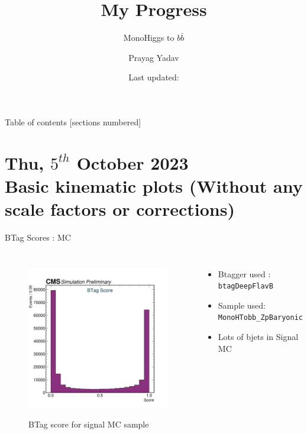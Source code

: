\documentclass[10pt,xcolor=dvipsnames]{beamer}
\title{My Progress}
\subtitle{MonoHiggs to $b \bar{b}$}
\author{Prayag Yadav}
\institute{University of Hyderabad}
\date{Last updated: \DTMnow{}}
\begin{document}
\maketitle

\begin{frame}{Table of contents}
  [sections numbered]
  \tableofcontents%
\end{frame}


\section[Basic kinematic plots ]{\small{Thu, $5^{th}$ October 2023 } \\ Basic kinematic plots \tiny{(Without any scale factors or corrections)} }

  \begin{frame}[fragile]{BTag Scores : MC} 
    \begin{columns}
    \begin{figure} 
    \centering 
     \includegraphics[width=1\textwidth]{../Archive/KinemPlots/TagMC.png }
    \label{TagMC} 
    \caption{BTag score for signal MC sample}
    \end{figure} 
    \begin{itemize} 
    \raggedright 
    \small
    \item {Btagger used : \texttt{btagDeepFlavB}} 
    \item {Sample used: \texttt{MonoHTobb\_ZpBaryonic}} 
    \item Lots of bjets in Signal MC 
    \end{itemize}
    \end{columns} 
    \end{frame} 
    
\end{document}
